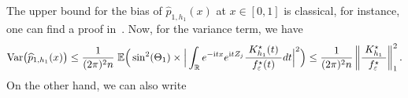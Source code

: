 \documentclass[11pt,a4paper,openany]{article}
\newcommand{\Var}{\mbox{Var}}
\def\R{\mathbb{R}}
\def\E{\mathbb{E}}
\begin{document}
The upper bound for the bias of $\widehat{p}_{1,h_{1}}(x)$ at $x \in [0 , 1]$ is classical, for instance, one can find a proof in~\cite[Lemma 5.1]{Nguyen-PhamNgoc-Rivoirard}. 
Now, for the variance term, we have 
\begin{align*}  
	\Var \big(  \widehat{p}_{1,h_{1}}(x) \big)   \leq  \dfrac{1}{(2\pi)^{2} n}     \hspace{0.1cm}    \E \Big(   \sin^{2}(\Theta_1)   \times    \Big|  \int_{\R}  e^{- \mathrm{i}tx} e^{ \mathrm{i}tZ_j} \dfrac{ \hspace{0.1cm}  K_{h_{1}}^{\star}(t) \hspace{0.1cm}   }{f_{\varepsilon}^{\star}(t)}   dt  \Big|^2  \Big)  \leq     \frac{1}{(2\pi)^{2} n}  \left\|  \dfrac{ \hspace{0.1cm}  K_{h_{1}}^{\star} \hspace{0.1cm}   }{f_{\varepsilon}^{\star}}    \right\|_{1}^{2}  .
\end{align*}  
On the other hand, we can also write  
\end{document}
